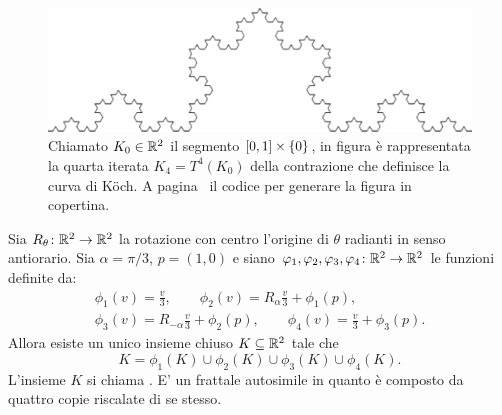 \begin{figure}
\centering\includegraphics[width=1.0\textwidth]{koch_picture}
\caption{
Chiamato $K_0 \in \mathbb R^2$ il segmento $[0,1]\times {\left\{ 0 \right\}}$,
in figura è rappresentata
la quarta iterata $K_4 = T^4(K_0)$ della contrazione che definisce la curva di K{\"o}ch.
A pagina~\pageref{code:Koch} il codice per generare la figura in copertina.
}
\label{fig:koch}
\end{figure}

\begin{example}[curva di K{\"o}ch]
Sia $R_\theta\colon \mathbb R^2 \to \mathbb R^2$ la rotazione con centro l'origine di $\theta$ radianti in senso antiorario.
Sia $\alpha = \pi/3$, $p=(1,0)$ e
siano $\varphi_1, \varphi_2, \varphi_3, \varphi_4 \colon \mathbb R^2 \to \mathbb R^2$
le funzioni definite da:
\begin{align*}
\phi_1(v) = \frac{v}{3}, \qquad
\phi_2(v) = R_{\alpha}\frac{v}{3} + \phi_1(p), \\
\phi_3(v) = R_{-\alpha}\frac{v}{3} + \phi_2(p), \qquad
\phi_4(v) = \frac{v}{3} + \phi_3(p).
\end{align*}
Allora esiste un unico insieme chiuso $K\subseteq \mathbb R^2$ tale che
\[
  K = \phi_1(K) \cup \phi_2(K) \cup \phi_3(K) \cup \phi_4(K).
\]
L'insieme $K$ si chiama . E' un frattale autosimile in quanto è composto da quattro copie riscalate di se stesso.
\end{example}
